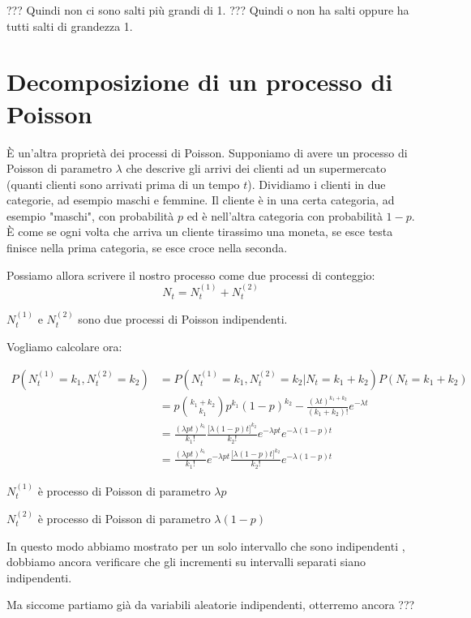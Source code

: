 \documentclass[a4paper,12pt]{book}
\begin{document}
??? %
Quindi non ci sono salti più grandi di 1.
??? %
Quindi o non ha salti oppure ha tutti salti di grandezza 1.

\section{Decomposizione di un processo di Poisson}
È un'altra proprietà dei processi di Poisson. Supponiamo di avere un processo di Poisson di parametro $\lambda$ che descrive gli arrivi dei clienti ad un supermercato (quanti clienti sono arrivati prima di un tempo $ t $). Dividiamo i clienti in due categorie, ad esempio maschi e femmine. Il cliente è in una certa categoria, ad esempio "maschi", con probabilità $ p $ ed è nell'altra categoria con probabilità $ 1-p $. È come se ogni volta che arriva un cliente tirassimo una moneta, se esce testa finisce nella prima categoria, se esce croce nella seconda. 

Possiamo allora scrivere il nostro processo come due processi di conteggio:
$$ N_t = N_t^{(1)} + N_t^{(2)} $$

$ N_t^{(1)} $ e $ N_t^{(2)} $ sono due processi di Poisson indipendenti. 

Vogliamo calcolare ora:

\begin{align*}
	P(N_t^{(1)} = k_1, N_t^{(2)} = k_2) & = P(N_t^{(1)} = k_1, N_t^{(2)} = k_2 | N_t = k_1 + k_2) P(N_t = k_1 + k_2) \\
	& = p \binom{k_1 + k_2}{k_1} p^{k_1} (1-p)^{k_2} - \frac{(\lambda t)^{k_1 + k_2}}{(k_1 + k_2)!} e^{-\lambda t} \\
	& = \frac{(\lambda p t)^{k_1}}{k_1!} \frac{\big[ \lambda(1-p)t \big]^{k_2}}{k_2!} e^{-\lambda p t} e^{-\lambda(1-p) t} \\
	& = \frac{(\lambda p t)^{k_1}}{k_1!} e^{-\lambda p t} \frac{\big[ \lambda(1-p) t \big]^{k_2}}{k_2 !} e^{-\lambda (1-p) t}
\end{align*}

$ N_t^{(1)} $ è processo di Poisson di parametro $\lambda p$

$ N_t^{(2)} $ è processo di Poisson di parametro $\lambda(1-p)$

In questo modo abbiamo mostrato per un solo intervallo che sono indipendenti %
, dobbiamo ancora verificare che gli incrementi su intervalli separati siano indipendenti.

Ma siccome partiamo già da variabili aleatorie indipendenti, otterremo ancora ??? %
\end{document}
